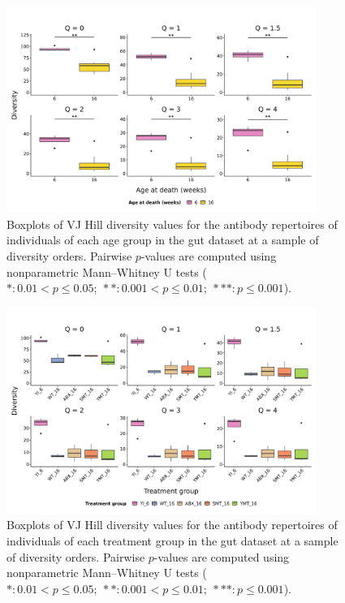 \begin{figure}
\centering
\includegraphics[width = 0.9\textwidth]{_Figures/png/igseq-gut-VJ-diversity-solo-age}
\caption{Boxplots of VJ Hill diversity values for the antibody repertoires of individuals of each age group in the \igseq gut dataset at a sample of diversity orders. Pairwise $p$-values are computed using nonparametric Mann–Whitney U tests ($*: 0.01 < p \leq 0.05;~**: 0.001 < p \leq 0.01;~***: p \leq 0.001$).}
\label{fig:igseq-gut-VJ-diversity-solo-age}
\end{figure}

\begin{figure}
\centering
\includegraphics[width = 0.9\textwidth]{_Figures/png/igseq-gut-VJ-diversity-solo-groups}
\caption{Boxplots of VJ Hill diversity values for the antibody repertoires of individuals of each treatment group in the \igseq gut dataset at a sample of diversity orders. Pairwise $p$-values are computed using nonparametric Mann–Whitney U tests ($*: 0.01 < p \leq 0.05;~**: 0.001 < p \leq 0.01;~***: p \leq 0.001$).}
\label{fig:igseq-gut-VJ-diversity-solo-groups}
\end{figure}


